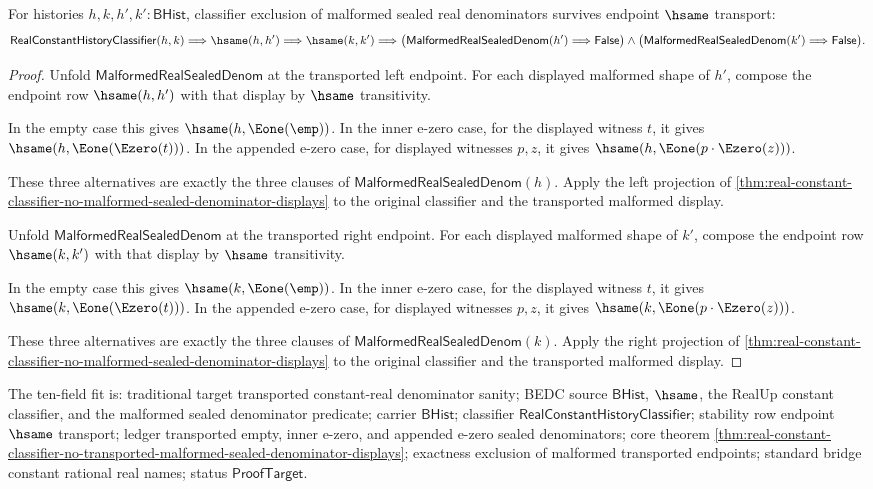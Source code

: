 \begin{theorem}
\label{thm:real-constant-classifier-no-transported-malformed-sealed-denominator-displays}
For histories $h,k,h',k':\mathsf{BHist}$, classifier exclusion of malformed
sealed real denominators survives endpoint $\hsame$ transport:
$$
\mathsf{RealConstantHistoryClassifier}(h,k)
\Longrightarrow
\hsame(h,h')
\Longrightarrow
\hsame(k,k')
\Longrightarrow
\bigl(\mathsf{MalformedRealSealedDenom}(h')\Longrightarrow\mathsf{False}\bigr)
\land
\bigl(\mathsf{MalformedRealSealedDenom}(k')\Longrightarrow\mathsf{False}\bigr).
$$
\end{theorem}
\begin{proof}
Unfold $\mathsf{MalformedRealSealedDenom}$ at the transported left endpoint.
For each displayed malformed shape of $h'$, compose the endpoint row
$\hsame(h,h')$ with that display by $\hsame$ transitivity.

In the empty case this gives $\hsame(h,\Eone(\emp))$. In the inner e-zero
case, for the displayed witness $t$, it gives $\hsame(h,\Eone(\Ezero(t)))$.
In the appended e-zero case, for displayed witnesses $p,z$, it gives
$\hsame(h,\Eone(p\cdot\Ezero(z)))$.

These three alternatives are exactly the three clauses of
$\mathsf{MalformedRealSealedDenom}(h)$. Apply the left projection of
\autoref{thm:real-constant-classifier-no-malformed-sealed-denominator-displays}
to the original classifier and the transported malformed display.

Unfold $\mathsf{MalformedRealSealedDenom}$ at the transported right endpoint.
For each displayed malformed shape of $k'$, compose the endpoint row
$\hsame(k,k')$ with that display by $\hsame$ transitivity.

In the empty case this gives $\hsame(k,\Eone(\emp))$. In the inner e-zero
case, for the displayed witness $t$, it gives $\hsame(k,\Eone(\Ezero(t)))$.
In the appended e-zero case, for displayed witnesses $p,z$, it gives
$\hsame(k,\Eone(p\cdot\Ezero(z)))$.

These three alternatives are exactly the three clauses of
$\mathsf{MalformedRealSealedDenom}(k)$. Apply the right projection of
\autoref{thm:real-constant-classifier-no-malformed-sealed-denominator-displays}
to the original classifier and the transported malformed display.
\end{proof}

The ten-field fit is: traditional target transported constant-real
denominator sanity; BEDC source $\mathsf{BHist}$, $\hsame$, the RealUp
constant classifier, and the malformed sealed denominator predicate; carrier
$\mathsf{BHist}$; classifier $\mathsf{RealConstantHistoryClassifier}$;
stability row endpoint $\hsame$ transport; ledger transported empty, inner
e-zero, and appended e-zero sealed denominators; core theorem
\autoref{thm:real-constant-classifier-no-transported-malformed-sealed-denominator-displays};
exactness exclusion of malformed transported endpoints; standard bridge
constant rational real names; status $\mathsf{ProofTarget}$.

